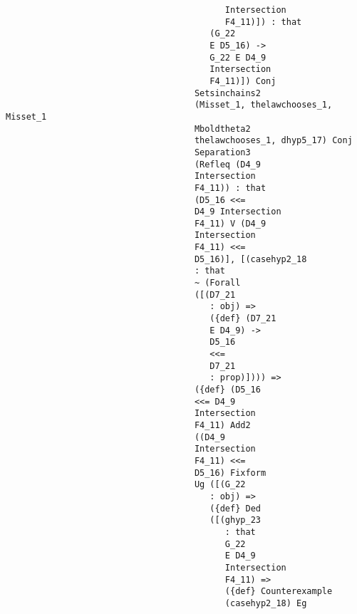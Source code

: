 \documentclass[12pt]{article}
\begin{document}
\begin{verbatim}
                                           Intersection 
                                           F4_11)]) : that 
                                        (G_22 
                                        E D5_16) -> 
                                        G_22 E D4_9 
                                        Intersection 
                                        F4_11)]) Conj 
                                     Setsinchains2 
                                     (Misset_1, thelawchooses_1, Misset_1 
                                     Mboldtheta2 
                                     thelawchooses_1, dhyp5_17) Conj 
                                     Separation3 
                                     (Refleq (D4_9 
                                     Intersection 
                                     F4_11)) : that 
                                     (D5_16 <<= 
                                     D4_9 Intersection 
                                     F4_11) V (D4_9 
                                     Intersection 
                                     F4_11) <<= 
                                     D5_16)], [(casehyp2_18 
                                     : that 
                                     ~ (Forall 
                                     ([(D7_21 
                                        : obj) => 
                                        ({def} (D7_21 
                                        E D4_9) -> 
                                        D5_16 
                                        <<= 
                                        D7_21 
                                        : prop)]))) => 
                                     ({def} (D5_16 
                                     <<= D4_9 
                                     Intersection 
                                     F4_11) Add2 
                                     ((D4_9 
                                     Intersection 
                                     F4_11) <<= 
                                     D5_16) Fixform 
                                     Ug ([(G_22 
                                        : obj) => 
                                        ({def} Ded 
                                        ([(ghyp_23 
                                           : that 
                                           G_22 
                                           E D4_9 
                                           Intersection 
                                           F4_11) => 
                                           ({def} Counterexample 
                                           (casehyp2_18) Eg 

\end{verbatim}
\end{document}
